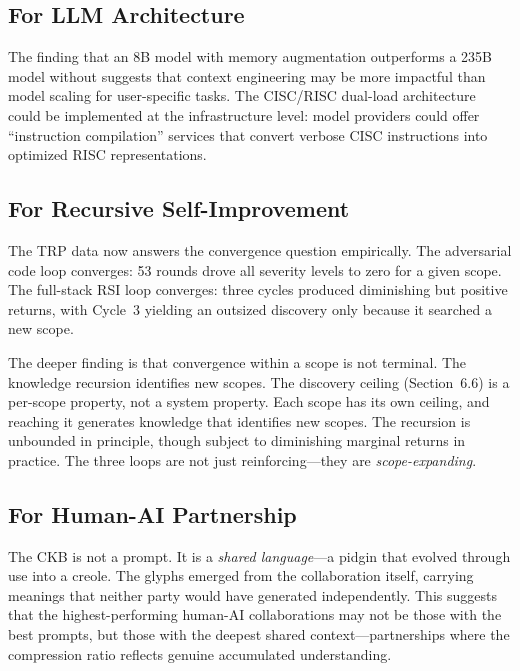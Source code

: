 \documentclass[11pt, a4paper]{article}
\begin{document}
\subsection{For LLM Architecture}

The finding that an 8B model with memory augmentation outperforms a 235B model without \citep{knowledge2026} suggests that context engineering may be more impactful than model scaling for user-specific tasks. The CISC/RISC dual-load architecture could be implemented at the infrastructure level: model providers could offer ``instruction compilation'' services that convert verbose CISC instructions into optimized RISC representations.

\subsection{For Recursive Self-Improvement}

The TRP data now answers the convergence question empirically. The adversarial code loop converges: 53 rounds drove all severity levels to zero for a given scope. The full-stack RSI loop converges: three cycles produced diminishing but positive returns, with Cycle~3 yielding an outsized discovery only because it searched a new scope.

The deeper finding is that convergence within a scope is not terminal. The knowledge recursion identifies new scopes. The discovery ceiling (Section~6.6) is a per-scope property, not a system property. Each scope has its own ceiling, and reaching it generates knowledge that identifies new scopes. The recursion is unbounded in principle, though subject to diminishing marginal returns in practice. The three loops are not just reinforcing---they are \emph{scope-expanding}.

\subsection{For Human-AI Partnership}

The CKB is not a prompt. It is a \emph{shared language}---a pidgin that evolved through use into a creole. The glyphs emerged from the collaboration itself, carrying meanings that neither party would have generated independently. This suggests that the highest-performing human-AI collaborations may not be those with the best prompts, but those with the deepest shared context---partnerships where the compression ratio reflects genuine accumulated understanding.

\end{document}

